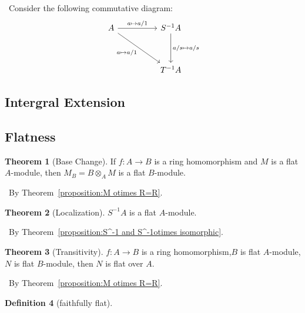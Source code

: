 \documentclass[a4paper,12pt]{article}
\newenvironment{prooff}{{\noindent\it\textcolor{cyan!40!black}{Proof}:}\,}{\par}
\theoremstyle{definition}
\newtheorem{defn}{Definition}[subsection]
\newtheorem{theo}[defn]{Theorem}
\begin{document}
\begin{prooff}
    Consider the following commutative diagram:
    \[\begin{tikzcd}
            A && {S^{-1}A} \\
            \\
            && {T^{-1}A}
            \arrow["{a\mapsto a/1}", from=1-1, to=1-3]
            \arrow["{a/s\mapsto a/s}", from=1-3, to=3-3]
            \arrow["{a\mapsto a/1}"', from=1-1, to=3-3]
        \end{tikzcd}\]
\end{prooff}






\newpage
\subsection{Intergral Extension}


\newpage
\subsection{Flatness}
\begin{theo}[Base Change]
    If $f:A\rightarrow B$ is a ring homomorphism and $M$ is a flat $A$-module,
    then $M_B=B\otimes_A M $ is a flat $B$-module.
\end{theo}
\begin{prooff}
    By Theorem~\ref{proposition:M otimes R=R}.
\end{prooff}
\begin{theo}[Localization]
    $S^{-1}A$ is a flat $A$-module.
    \label{theorem:flatness:localization}
\end{theo}
\begin{prooff}
    By Theorem~\ref{proposition:S^-1 and S^-1otimes isomorphic}.
\end{prooff}
\begin{theo}[Transitivity]
    $f:A\rightarrow B$ is a ring homomorphism,$B$ is flat $A$-module, $N$ is flat $B$-module, then $N$ is flat over $A$.
\end{theo}
\begin{prooff}
    By Theorem~\ref{proposition:M otimes R=R}.
\end{prooff}

\begin{defn}[faithfully flat]

\end{defn}
\end{document}
